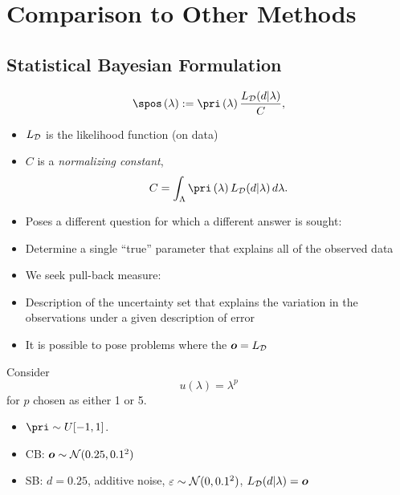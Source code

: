 \section{Comparison to Other Methods}
\subsection{Statistical Bayesian Formulation}
\begin{frame}[t]

\begin{equation}\label{eq:sb_post}
    \spos\lam := \pri\lam \frac{L_\dspace (d | \lambda)}{ C },
\end{equation}
\begin{itemize}

	\item <1-> $L_{\mathcal{D}}$ is the likelihood function (on data)
	\item <1-> $C$ is a \emph{normalizing constant},
	\[
		C = \int_\pspace \pri\lam L_\dspace(d | \lambda) \, d\lambda.
	\]
	\item <2-> Poses a different question for which a different answer is sought:
	\item <2-> Determine a single ``true'' parameter that explains all of the observed data \cite{Smith, Concrete, Complete}
	\item <3-> We seek pull-back measure:
	\item <3-> Description of the uncertainty set that explains the variation in the observations under a given description of error
	\item <4-> It is possible to pose problems where the $\operatorname*{\boldsymbol{o}} = L_{\mathcal{D}}$

\end{itemize}

\end{frame}

\begin{frame}[t]
\begin{example}
Consider
\begin{equation}
u(\lambda) = \lambda^p
\end{equation}
for $p$ chosen as either 1 or 5. 

\begin{itemize}
	\item <1-> $\pri \sim U[-1,1]$. 
	\item <1-> CB: $\operatorname*{\boldsymbol{o}} \sim \mathcal{N}(0.25,0.1^2)$
	\item <1-> SB: $d=0.25$, additive noise, $\varepsilon \sim \mathcal{N}(0,0.1^2)$, $L_{\mathcal{D}}(d | \lambda) = \operatorname*{\boldsymbol{o}}$
\end{itemize}
\end{example}
\end{frame}

